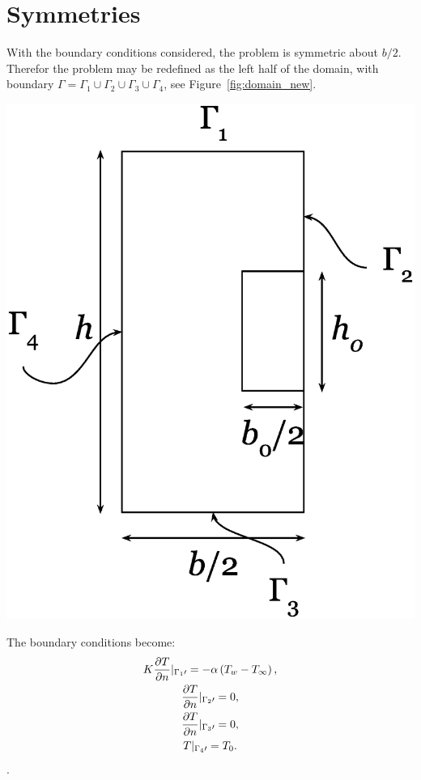 \section{Symmetries}
With the boundary conditions considered, the problem is symmetric about $b/2$. Therefor the problem may be redefined as the left half of the domain, with boundary $\Gamma=\Gamma_1\cup\Gamma_2\cup\Gamma_3\cup\Gamma_4$, see Figure~\ref{fig:domain_new}. \begin{Figure}
 \centerfloat
 \includegraphics[width=0.7\linewidth]{domain_new.eps}
 \label{fig:domain_new}
\end{Figure} The boundary conditions become:
\begin{equation}
\begin{gathered}
    K\frac{\partial T}{\partial n}\arrowvert_{\Gamma_1\prime} = -\alpha \left(T_w - T_{\infty}\right),\\
    \frac{\partial T}{\partial n}\arrowvert_{\Gamma_2\prime} = 0,\\
    \frac{\partial T}{\partial n}\arrowvert_{\Gamma_3\prime} = 0,\\
    T\arrowvert_{\Gamma_4\prime} = T_0.
\end{gathered}\label{eq:bc}
\end{equation}.


